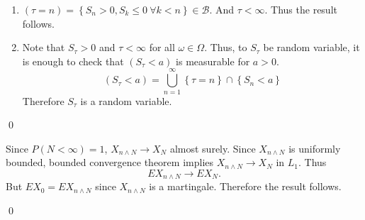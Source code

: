 \begin{problem}[2012.3] \hfill
	\begin{enumerate}[label = (\alph*)]
		\item $(\tau = n) = \left\{ S_n > 0, S_k \leq 0 \  \forall k < n \right\} \in \mathcal{B}$.
			And $\tau < \infty$. Thus the result follows.

		\item Note that $S_\tau > 0 $ and $\tau < \infty$ for all $\omega \in \Omega$.
			Thus, to $S_\tau$ be random variable, it is enough to check that $(S_\tau < a)$ is measurable for $a>0$.
			\[
				(S_\tau < a) = \bigcup_{n=1}^\infty \left\{ \tau = n \right\} \cap \left\{ S_n <a \right\}
			\]
			Therefore $S_\tau$ is a random variable.
	\end{enumerate}

	\qed

\end{problem}
\begin{problem}[2012.9] \hfill

	Since $P(N <\infty) = 1$, $X_{n\wedge N} \rightarrow X_N$ almost surely.
	Since $X_{n \wedge N}$ is uniformly bounded, bounded convergence theorem implies $X_{n \wedge N} \rightarrow X_N$ in $L_1$.
	Thus
	\[
		EX_{n \wedge N} \rightarrow EX_N.
	\]
	But $EX_0 = EX_{n\wedge N}$ since $X_{n\wedge N}$ is a martingale.
	Therefore the result follows.

	\qed

\end{problem}

